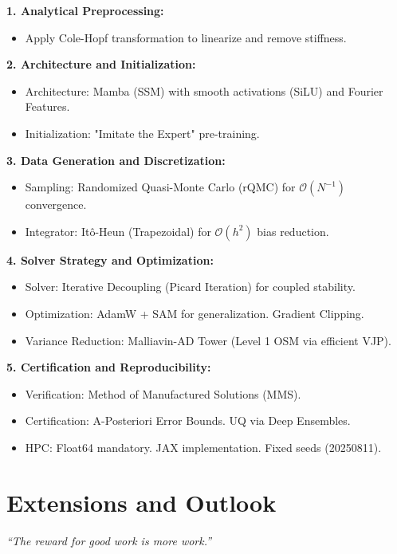 \documentclass[11pt,letterpaper,oneside]{article}
\theoremstyle{plain}
\theoremstyle{definition}
\theoremstyle{remark}
\begin{document}
\begin{tcolorbox}[colback=gray!5!white, colframe=gray!50!black, title={Unified State-of-the-Art Pipeline (2025)}]
\textbf{1. Analytical Preprocessing:}
\begin{itemize}
    \item Apply Cole-Hopf transformation to linearize and remove stiffness.
\end{itemize}
\textbf{2. Architecture and Initialization:}
\begin{itemize}
    \item Architecture: Mamba (SSM) with smooth activations (SiLU) and Fourier Features.
    \item Initialization: "Imitate the Expert" pre-training.
\end{itemize}
\textbf{3. Data Generation and Discretization:}
\begin{itemize}
    \item Sampling: Randomized Quasi-Monte Carlo (rQMC) for $\mathcal{O}(N^{-1})$ convergence.
    \item Integrator: Itô-Heun (Trapezoidal) for $\mathcal{O}(h^2)$ bias reduction.
\end{itemize}
\textbf{4. Solver Strategy and Optimization:}
\begin{itemize}
    \item Solver: Iterative Decoupling (Picard Iteration) for coupled stability.
    \item Optimization: AdamW + SAM for generalization. Gradient Clipping.
    \item Variance Reduction: Malliavin-AD Tower (Level 1 OSM via efficient VJP).
\end{itemize}
\textbf{5. Certification and Reproducibility:}
\begin{itemize}
    \item Verification: Method of Manufactured Solutions (MMS).
    \item Certification: A-Posteriori Error Bounds. UQ via Deep Ensembles.
    \item HPC: Float64 mandatory. JAX implementation. Fixed seeds (20250811).
\end{itemize}
\end{tcolorbox}

\clearpage
\part{Extensions and Outlook}
\label{part:extensions}

\begin{center}
\textit{“The reward for good work is more work.”}
\end{center}
\end{document}
